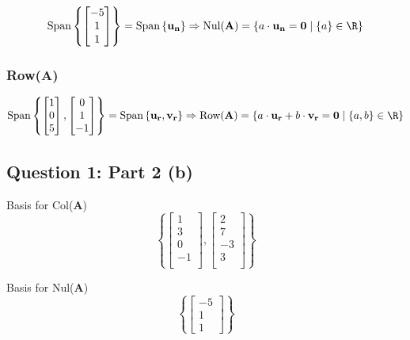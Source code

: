 \documentclass{article}
\begin{document}
\[%
    \text{Span} \left\{  
    \begin{bmatrix} 
        -5\\1\\1
    \end{bmatrix}
    \right\}
    =
    \text{Span} \left\{ \mathbf{u_{n}}   \right\}
    \Rightarrow 
    \text{Nul}(\mathbf{A})
    =
    \left\{ 
    a \cdot\mathbf{u_{n}} = \mathbf{0}  \mid \left\{ a \right\}
    \in \R
    \right\}
\]%

\subsubsection{Row(\textbf{A})} 

\[%
    \text{Span} \left\{
    \begin{bmatrix} 1\\0\\5\\   \end{bmatrix},
    \begin{bmatrix} 0\\1\\-1\\  \end{bmatrix}
    \right\}
    =
    \text{Span} \left\{ 
    \mathbf{u_{r}},
    \mathbf{v_{r}}
    \right\}
    \Rightarrow 
    \text{Row}(\mathbf{A})=
    \left\{
    a \cdot \mathbf{u_{r}} +
    b \cdot \mathbf{v_{r}} 
    =
    \mathbf{0}
    \mid   
    \left\{ a,b \right\} \in \R
    \right\}
\]%


\subsection{Question 1: Part 2 (b)} 
Basis for Col($ \mathbf{A} $)
\[%
    \left\{ 
    \begin{bmatrix} 1\\3\\0\\-1\\ \end{bmatrix},
    \begin{bmatrix} 2\\7\\-3\\3\\ \end{bmatrix}
    \right\}
\]%

Basis for Nul($ \mathbf{A} $)
\[%
    \left\{ 
    \begin{bmatrix} -5\\1\\1 \end{bmatrix}
    \right\}
\]%
\end{document}
